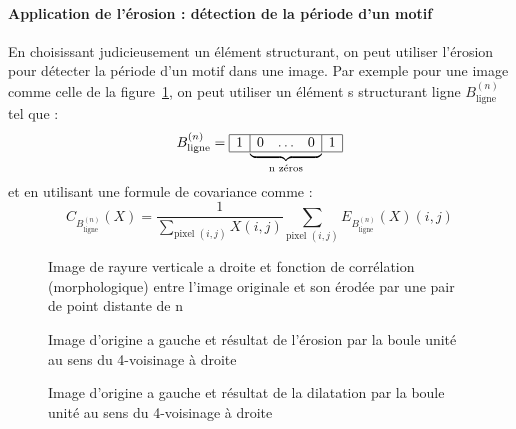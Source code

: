 \documentclass[10pt,a4paper]{article}
\begin{document}
\paragraph{Application de l'\'{e}rosion : d\'{e}tection de la p\'{e}riode d'un motif} En choisissant  judicieusement un \'{e}l\'{e}ment structurant, on peut utiliser l'\'{e}rosion pour d\'{e}tecter la p\'{e}riode d'un motif dans une image. Par exemple pour une image comme celle de la figure~\ref{periode}, on peut utiliser un \'{e}l\'{e}ment s structurant ligne $B_{\text{ligne}}^{\left(n\right)}$ tel que : 
\begin{displaymath}
B_{\text{ligne}}^{\left(n\right)} = \begin{array}{|c|}
	\hline 1  \\
	\hline
\end{array}
\underset{\text{n z\'{e}ros}}{\underbrace{
\begin{array}{ccc}
	\hline  0 & \ldots & 0   \\
	\hline
\end{array}}}
\begin{array}{|c|}
	\hline 1  \\
	\hline
\end{array}
\end{displaymath}
et en utilisant une formule de covariance comme : 
\begin{displaymath}
	C_{B_{\text{ligne}}^{\left(n\right)}}\left(X\right)= \frac{1}{\underset{\text{pixel }\left(i,j\right)}{\sum} X\left(i,j\right) } \underset{\text{pixel }\left(i,j\right)}{\sum} E_{B_{\text{ligne}}^{\left(n\right)}}\left(X\right)\left(i,j\right) 
\end{displaymath}
\begin{figure}[h]
\scalebox{0.66}{}
\caption{Image de rayure verticale a droite et fonction de corr\'{e}lation (morphologique) entre l'image originale et son \'{e}rod\'{e}e par une pair de point distante de n}
\label{periode}
\end{figure}
\begin{figure}[h]
	\centering
\scalebox{0.45}{}\scalebox{0.45}{}
	\caption{Image d'origine a gauche et r\'{e}sultat de l’\'{e}rosion par la boule unit\'{e} au sens du 4-voisinage \`{a} droite}
	\label{erosion}
\end{figure}

\begin{figure}[h]
	\centering
	\scalebox{0.45}{}\scalebox{0.45}{}
	\caption{Image d'origine a gauche et r\'{e}sultat de la dilatation par la boule unit\'{e} au sens du 4-voisinage \`{a} droite}
	\label{dilatation}
\end{figure}
\end{document}
